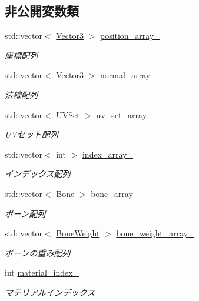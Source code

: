\subsection*{非公開変数類}
\begin{DoxyCompactItemize}
\item 
std\+::vector$<$ \mbox{\hyperlink{class_md_bin_data_1_1_vector3}{Vector3}} $>$ \mbox{\hyperlink{class_md_bin_data_1_1_mesh_a5231c53c468bde7cabe18e9905df9eb7}{position\+\_\+array\+\_\+}}
\begin{DoxyCompactList}\small\item\em 座標配列 \end{DoxyCompactList}\item 
std\+::vector$<$ \mbox{\hyperlink{class_md_bin_data_1_1_vector3}{Vector3}} $>$ \mbox{\hyperlink{class_md_bin_data_1_1_mesh_ae73fb103e959ed320999d26f2c701919}{normal\+\_\+array\+\_\+}}
\begin{DoxyCompactList}\small\item\em 法線配列 \end{DoxyCompactList}\item 
std\+::vector$<$ \mbox{\hyperlink{class_md_bin_data_1_1_mesh_1_1_u_v_set}{U\+V\+Set}} $>$ \mbox{\hyperlink{class_md_bin_data_1_1_mesh_a50d8ce29adc888bbc28405870b6bdb2e}{uv\+\_\+set\+\_\+array\+\_\+}}
\begin{DoxyCompactList}\small\item\em U\+Vセット配列 \end{DoxyCompactList}\item 
std\+::vector$<$ int $>$ \mbox{\hyperlink{class_md_bin_data_1_1_mesh_a3a91c472a9893b856c0cbdf5153b7d33}{index\+\_\+array\+\_\+}}
\begin{DoxyCompactList}\small\item\em インデックス配列 \end{DoxyCompactList}\item 
std\+::vector$<$ \mbox{\hyperlink{class_md_bin_data_1_1_mesh_1_1_bone}{Bone}} $>$ \mbox{\hyperlink{class_md_bin_data_1_1_mesh_aa44666e787f7f160fd0a8060fbed83f3}{bone\+\_\+array\+\_\+}}
\begin{DoxyCompactList}\small\item\em ボーン配列 \end{DoxyCompactList}\item 
std\+::vector$<$ \mbox{\hyperlink{class_md_bin_data_1_1_mesh_1_1_bone_weight}{Bone\+Weight}} $>$ \mbox{\hyperlink{class_md_bin_data_1_1_mesh_a329c3832f7ec6e5b223ff6b5a082041d}{bone\+\_\+weight\+\_\+array\+\_\+}}
\begin{DoxyCompactList}\small\item\em ボーンの重み配列 \end{DoxyCompactList}\item 
int \mbox{\hyperlink{class_md_bin_data_1_1_mesh_a58c72ec3b7d3acb023d733c4b7322fb8}{material\+\_\+index\+\_\+}}
\begin{DoxyCompactList}\small\item\em マテリアルインデックス \end{DoxyCompactList}\end{DoxyCompactItemize}
